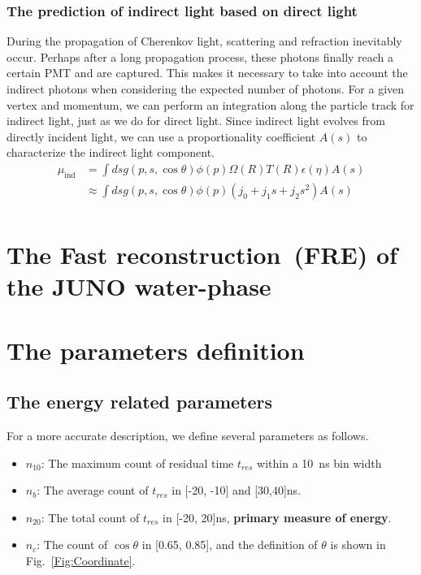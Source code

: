 \subsubsection{The prediction of indirect light based on direct light}
During the propagation of Cherenkov light, scattering and refraction inevitably occur. Perhaps after a long propagation process, these photons finally reach a certain PMT and are captured. This makes it necessary to take into account the indirect photons when considering the expected number of photons. For a given vertex and momentum, we can perform an integration along the particle track for indirect light, just as we do for direct light. Since indirect light evolves from directly incident light, we can use a proportionality coefficient $A(s)$ to characterize the indirect light component.
\begin{equation}
	\begin{aligned}
		\mu_{\mathrm{ind}} & =\int ds g(p,s,\cos\theta)\phi(p)\Omega(R)T(R)\epsilon(\eta)A(s) \\
		                   & \approx \int ds g(p,s,\cos\theta)\phi(p)(j_0 + j_1s+j_2s^2)A(s)  \\
	\end{aligned}
	\label{eq:indir}
\end{equation}

\section{The Fast reconstruction~(FRE) of the JUNO water-phase}

\section{The parameters definition}
\subsection{The energy related parameters}
For a more accurate description, we define several parameters as follows.
\begin{itemize}
	\item $n_{10}$: The maximum count of residual time $t_{res}$ within a
	      \SI{10}{\nano s} bin width
	\item $n_{b}$: The average count of $t_{res}$ in [-20, -10] and
		      [30,40]\si{\nano s}.
	\item $n_{20}$: The total count of $t_{res}$ in [-20, 20]\si{\nano s},
	      \textbf{primary measure of energy}.
	\item $n_c$: The count of $\cos\theta$ in [0.65, 0.85], and the definition of $\theta$ is shown in Fig.~\ref{Fig:Coordinate}.
\end{itemize}

